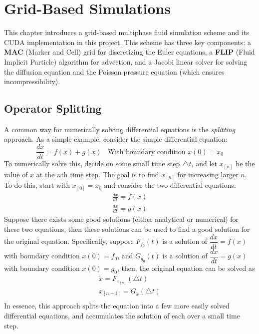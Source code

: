 \chapter{Grid-Based Simulations}
\label{chapter grid}

This chapter introduces a grid-based multiphase fluid simulation scheme and its CUDA implementation in this project. This scheme has three key components: a \textbf{MAC} (Marker and Cell) grid for discretizing the Euler equations, a \textbf{FLIP} (Fluid Implicit Particle) algorithm for advection, and a Jacobi linear solver for solving the diffusion equation and the Poisson pressure equation (which ensures incompressibility).

\section{Operator Splitting}
\label{section splitting}
A common way for numerically solving differential equations is the \textit{splitting} approach. As a simple example, consider the simple differential equation:
$$
\frac{dx}{dt} = f(x)+g(x) ~~~~\mbox{With boundary condition $x(0)=x_0$}
$$
To numerically solve this, decide on some small time step $\triangle t$, and let $x_{[n]}$ be the value of $x$ at the $n$th time step. The goal is to find $x_{[n]}$ for increasing larger $n$. To do this, start with $x_{[0]}=x_0$ and consider the two differential equations:
\begin{equation*}
    \begin{aligned}
        \frac{dx}{dt} = f(x)\\
        \frac{dx}{dt} = g(x)
    \end{aligned}
\end{equation*}
Suppose there exists some good solutions (either analytical or numerical) for these two equations, then these solutions can be used to find a good solution for the original equation. Specifically, suppose $F_{f_0}(t)$ is a solution of $\dfrac{dx}{dt} = f(x)$ with boundary condition $x(0)=f_0$, and $G_{g_0}(t)$ is a solution of $\dfrac{dx}{dt} = g(x)$ with boundary condition $x(0)=g_0$, then, the original equation can be solved as 
\begin{equation*}
    \begin{aligned}
        \widetilde{x} = F_{x_{[n]}}(\triangle t) \\
        x_{[n+1]} = G_{\widetilde{x}}(\triangle t) \\
    \end{aligned}
\end{equation*}
In essence, this approach splits the equation into a few more easily solved differential equations, and accumulates the solution of each over a small time step. 


